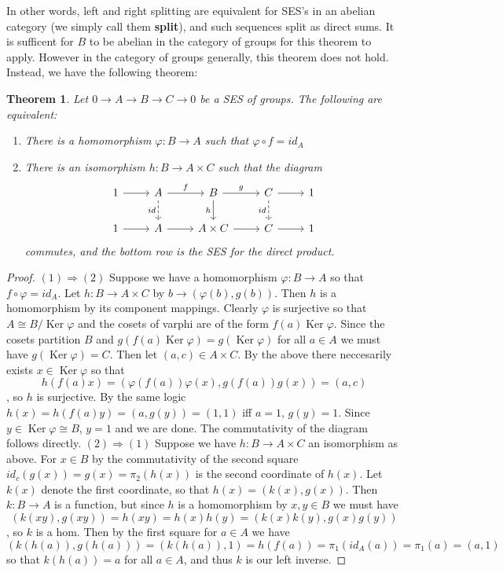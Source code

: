 \documentclass{report}
\DeclareMathOperator{\ker}{Ker}
\newtheorem{theorem}{Theorem}
\begin{document}
\begin{singlespace}
\begin{enumerate}
      In other words, left and right splitting are equivalent for SES's in an abelian category (we simply call them \textbf{split}), and such sequences split as direct sums. It is sufficent for $B$ to be abelian in the category of groups for this theorem to apply. However in the category of groups generally, this theorem does not hold. Instead, we have the following theorem:
      \begin{theorem}
        Let $0\to A\to B\to C\to 0$ be a SES of groups. The following are equivalent:
        \begin{enumerate}
        \item There is a homomorphism $\varphi:B\to A$ such that $\varphi\circ f =id_A$
        \item There is an isomorphism $h:B\to A\times C$ such that the diagram
        \[\begin{tikzcd}
         1 & A & B & C & 1 \\
	 1 & A & {A\times C} & C & 1
	 \arrow[from=1-1, to=1-2]
	 \arrow["f", from=1-2, to=1-3]
	 \arrow["g", from=1-3, to=1-4]
	 \arrow[from=1-4, to=1-5]
	 \arrow[from=2-1, to=2-2]
	 \arrow[from=2-2, to=2-3]
	 \arrow[from=2-3, to=2-4]
	 \arrow[from=2-4, to=2-5]
	 \arrow["id"', dashed, from=1-4, to=2-4]
	 \arrow["id"', dashed, from=1-2, to=2-2]
	 \arrow["h"', from=1-3, to=2-3]
        \end{tikzcd}\]
        commutes, and the bottom row is the SES for the direct product.
       \end{enumerate}
     \end{theorem}
     \begin{proof}
       $(1)\Rightarrow(2)$ Suppose we have a homomorphism $\varphi:B\to A$ so that $f\circ \varphi=id_A$. Let $h:B\to A\times C$ by $b\to (\varphi(b), g(b))$. Then $h$ is a homomorphism by its component mappings. Clearly $\varphi$ is surjective so that $A\cong B/\ker \varphi$ and the cosets of varphi are of the form $f(a)\ker\varphi$.  Since the cosets partition $B$ and  $g(f(a)\ker \varphi)=g(\ker \varphi)$ for all $a\in A$ we must have $g(\ker \varphi)=C$. Then let $(a,c)\in A\times C$. By the above there neccesarily exists $x\in \ker \varphi$ so that \[h(f(a)x)=(\varphi(f(a))\varphi(x), g(f(a))g(x))=(a,c)\], so $h$ is surjective. By the same logic $h(x)=h(f(a)y)=(a, g(y))=(1,1)$ iff $a=1$, $g(y)=1$. Since $y\in\ker \varphi\cong B$, $y=1$ and we are done. The commutativity of the diagram follows directly.
       $(2)\Rightarrow(1)$ Suppose we have $h:B\to A\times C$ an isomorphism as above. For $x\in B$ by the commutativity of the second square $id_c(g(x)) = g(x) = \pi_2(h(x))$ is the second coordinate of $h(x)$. Let $k(x)$ denote the first coordinate, so that $h(x)=(k(x),g(x))$. Then $k:B\to A$ is a function, but since $h$ is a homomorphism by $x,y\in B$ we must have \[(k(xy),g(xy))=h(xy)=h(x)h(y)=(k(x)k(y),g(x)g(y))\], so $k$ is a hom. Then by the first square for $a\in A$ we have \[(k(h(a)),g(h(a)))=(k(h(a)),1)=h(f(a))=\pi_1(id_A(a))=\pi_1(a)=(a,1)\] so that $k(h(a))=a$ for all $a\in A$, and thus $k$ is our left inverse.

\end{proof}
\end{enumerate}
\end{singlespace}
\end{document}
